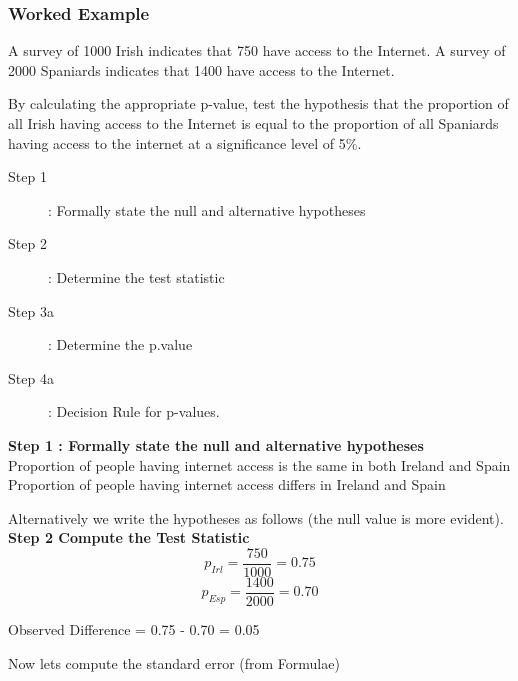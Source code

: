 ﻿\documentclass[]{report}
\begin{document}
\subsubsection{Worked Example}
A survey of 1000 Irish indicates that 750 have access to the Internet. A survey of 2000 Spaniards indicates that 1400 have access to the Internet.

\noindent By calculating the appropriate p-value, test the hypothesis that the proportion of all Irish having access to the Internet
is equal to the proportion of all Spaniards having access to the internet at a significance level of 5\%. %


\begin{description}
\item[Step 1] : Formally state the null and alternative hypotheses
\item[Step 2] : Determine the test statistic
\item[Step 3a] : Determine the p.value
\item[Step 4a] : Decision Rule for p-values.
\end{description}


\noindent \textbf{Step 1 : Formally state the null and alternative hypotheses}\\ 
Proportion of people having internet access is the same in both Ireland and Spain
Proportion of people having internet access differs in Ireland and Spain


Alternatively we write the hypotheses as follows (the null value is more evident).
\noindent \textbf{Step 2 Compute the Test Statistic}\\

\[p_{Irl}= \frac{750}{1000}= 0.75\] 
\[p_{Esp}= \frac{1400}{2000}= 0.70\]

Observed Difference = 0.75 - 0.70 = 0.05  

Now lets compute the standard error (from Formulae)
\end{document}
